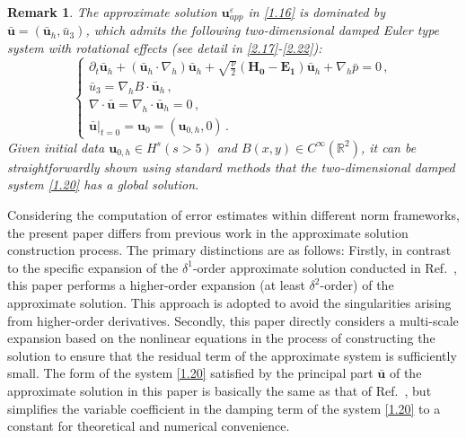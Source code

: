 \documentclass[pdflatex,sn-mathphys-num]{sn-jnl}%
\theoremstyle{thmstyleone}%
\theoremstyle{thmstyletwo}%
\newtheorem{remark}{Remark}%
\theoremstyle{thmstylethree}%
\theoremstyle{thmstyletwo}
\begin{document}
\begin{remark}
	The approximate solution $\boldsymbol{u}_{app}^{\varepsilon}$ in \eqref{1.16} is dominated by $\bar{\boldsymbol{u}}=(\bar {\boldsymbol u}_h,\bar u_3)$, which admits the following two-dimensional damped Euler type system with rotational effects (see detail in \eqref{2.17}-\eqref{2.22}):
	\begin{equation}\label{1.20}
		\begin{cases}
			\partial_{t} \bar {\boldsymbol u}_h+(\bar {\boldsymbol u}_h \cdot \nabla_h) \bar {\boldsymbol u}_h
			+\sqrt{\frac{\nu}{2 }}
			(\boldsymbol{H_0}
			- \boldsymbol{E_1})
			\bar{\boldsymbol u}_h+\nabla_h\bar p=0\,,\\
			\bar u_3=\nabla_h{B}\cdot\bar{\boldsymbol{u}}_h\,,\\
			\nabla\cdot \bar{\boldsymbol u}=\nabla_h \cdot \bar{\boldsymbol u}_h=0\,,\\
			\bar{\boldsymbol u}|_{t=0}={\boldsymbol u}_0=({\boldsymbol u}_{0,h},0)\,.
		\end{cases}
	\end{equation}
Given initial data \( {\boldsymbol u}_{0,h} \in H^{s} (s > 5) \) and \( B(x,y) \in C^\infty(\mathbb{R}^2) \), it can be straightforwardly shown using standard methods that the two-dimensional damped system \eqref{1.20} has a global solution. 
\end{remark}	



Considering the computation of error estimates within different norm frameworks, the present paper differs from previous work \cite{Jia2024} in the approximate solution construction process. 
The primary distinctions are as follows:
Firstly, in contrast to the specific expansion of the $\delta^1$-order approximate solution conducted in Ref.~\cite{Jia2024}, this paper performs a higher-order expansion (at least $\delta^2$-order) of the approximate solution. This approach is adopted to avoid the singularities arising from higher-order derivatives.
Secondly, this paper directly considers a multi-scale expansion based on the nonlinear equations in the process of constructing the solution to ensure that the residual term of the approximate system is sufficiently small. The form of the system \eqref{1.20} satisfied by the principal part $\bar{\boldsymbol{u}}$ of the approximate solution in this paper is basically the same as that of Ref.~\cite{Jia2024}, but simplifies the variable coefficient in the damping term of the system \eqref{1.20} to a constant for theoretical and numerical convenience.
\end{document}
